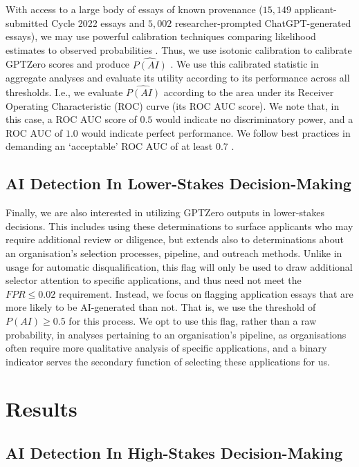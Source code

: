With access to a large body of essays of known provenance ($15,149$ applicant-submitted Cycle 2022 essays and $5,002$ researcher-prompted ChatGPT-generated essays), we may use powerful calibration techniques comparing likelihood estimates to observed probabilities \cite{Zadrozny_Elkan_2002,Niculescu-Mizil_Caruana_2005}. Thus, we use isotonic calibration to calibrate GPTZero scores and produce $\widehat{P(AI)}$ \cite{Zadrozny_Elkan_2002}. We use this calibrated statistic in aggregate analyses and evaluate its utility according to its performance across all thresholds. I.e., we evaluate $\widehat{P(AI)}$ according to the area under its Receiver Operating Characteristic (ROC) curve (its ROC AUC score). We note that, in this case, a ROC AUC score of $0.5$ would indicate no discriminatory power, and a ROC AUC of $1.0$ would indicate perfect performance. We follow best practices in demanding an `acceptable' ROC AUC of at least $0.7$ \cite{Mandrekar_2010}.

\subsection{AI Detection In Lower-Stakes Decision-Making}
Finally, we are also interested in utilizing GPTZero outputs in lower-stakes decisions. This includes using these determinations to surface applicants who may require additional review or diligence, but extends also to determinations about an organisation's selection processes, pipeline, and outreach methods. Unlike in usage for automatic disqualification, this flag will only be used to draw additional selector attention to specific applications, and thus need not meet the $FPR \leq 0.02$ requirement. Instead, we focus on flagging application essays that are more likely to be AI-generated than not. That is, we use the threshold of $P(AI) \geq 0.5$ for this process. We opt to use this flag, rather than a raw probability, in analyses pertaining to an organisation's pipeline, as organisations often require more qualitative analysis of specific applications, and a binary indicator serves the secondary function of selecting these applications for us.

\section{Results}
\subsection{AI Detection In High-Stakes Decision-Making}\label{ssec:res_accuracy}
